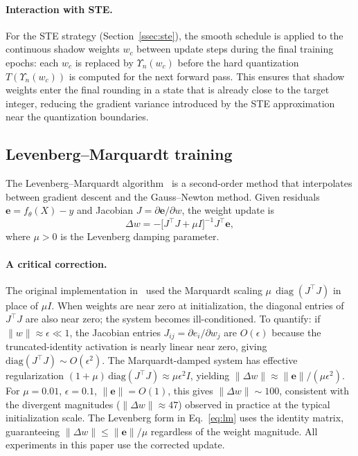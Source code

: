 \documentclass[10pt,a4paper,twoside]{article}
\begin{document}
\paragraph{Interaction with STE.}
For the STE strategy (Section~\ref{ssec:ste}), the smooth schedule is
applied to the continuous shadow weights $w_c$ between update steps during
the final training epochs: each $w_c$ is replaced by $\Upsilon_n(w_c)$
before the hard quantization $T(\Upsilon_n(w_c))$ is computed for the next
forward pass.
This ensures that shadow weights enter the final rounding in a state
that is already close to the target integer, reducing the gradient variance
introduced by the STE approximation near the quantization boundaries.

\subsection{Levenberg--Marquardt training}
\label{ssec:lm}

The Levenberg--Marquardt algorithm~\cite{levenberg1944,marquardt1963} is a
second-order method that interpolates between gradient descent and the
Gauss--Newton method.
Given residuals $\mathbf{e} = f_\theta(X) - y$ and Jacobian
$J = \partial \mathbf{e}/\partial w$, the weight update is
\begin{equation}
  \Delta w = -\bigl[J^\top J + \mu I\bigr]^{-1} J^\top \mathbf{e},
  \label{eq:lm}
\end{equation}
where $\mu > 0$ is the Levenberg damping parameter.

\paragraph{A critical correction.}
The original implementation in~\cite{leandro2009} used the Marquardt scaling
$\mu\,\operatorname{diag}(J^\top J)$ in place of $\mu I$.
When weights are near zero at initialization, the diagonal entries of
$J^\top J$ are also near zero; the system becomes ill-conditioned.
To quantify: if $\|w\| \approx \epsilon \ll 1$, the Jacobian entries
$J_{ij} = \partial e_i/\partial w_j$ are $O(\epsilon)$ because the
truncated-identity activation is nearly linear near zero, giving
$\mathrm{diag}(J^\top J) \sim O(\epsilon^2)$.
The Marquardt-damped system has effective regularization
$(1+\mu)\,\mathrm{diag}(J^\top J) \approx \mu\epsilon^2 I$, yielding
$\|\Delta w\| \approx \|\mathbf{e}\|/(\mu\epsilon^2)$.
For $\mu = 0.01$, $\epsilon = 0.1$, $\|\mathbf{e}\| = O(1)$, this gives
$\|\Delta w\| \sim 100$, consistent with the divergent magnitudes
($\|\Delta w\| \approx 47$) observed in practice at the typical
initialization scale.
The Levenberg form in Eq.~\eqref{eq:lm} uses the identity matrix, guaranteeing
$\|\Delta w\| \leq \|\mathbf{e}\|/\mu$ regardless of the weight magnitude.
All experiments in this paper use the corrected update.
\end{document}
